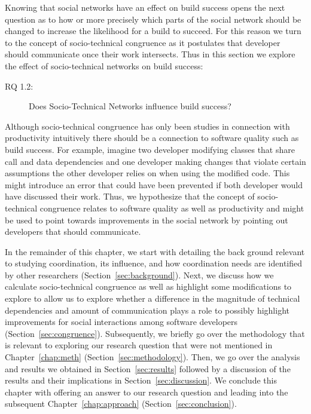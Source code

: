 \label{chap:stc-net2}
Knowing that social networks have an effect on build success opens the next question as to how or more precisely which parts of the social network should be changed to increase the likelihood for a build to succeed.
For this reason we turn to the concept of socio-technical congruence as it postulates that developer should communicate once their work intersects.
Thus in this section we explore the effect of socio-technical networks on build success:

\begin{description}
  \item[RQ 1.2:] Does Socio-Technical Networks influence build success?
\end{description}

Although socio-technical congruence has only been studies in connection with productivity intuitively there should be a connection to software quality such as build success.
For example, imagine two developer modifying classes that share call and data dependencies and one developer making changes that violate certain assumptions the other developer relies on when using the modified code.
This might introduce an error that could have been prevented if both developer would have discussed their work.
Thus, we hypothesize that the concept of socio-technical congruence relates to software quality as well as productivity and might be used to point towards improvements in the social network by pointing out developers that should communicate.

In the remainder of this chapter, we start with detailing the back ground relevant to studying coordination, its influence, and how coordination needs are identified by other researchers (Section~\ref{sec:background}).
Next, we discuss how we calculate socio-technical congruence as well as highlight some modifications to explore to allow us to explore whether a difference in the magnitude of technical dependencies and amount of communication plays a role to possibly highlight improvements for social interactions among software developers (Section~\ref{sec:congruence}).
Subsequently, we briefly go over the methodology that is relevant to exploring our research question that were not mentioned in Chapter~\ref{chap:meth} (Section~\ref{sec:methodology}).
Then, we go over the analysis and results we obtained in Section~\ref{sec:results} followed by a discussion of the results and their implications in Section~\ref{sec:discussion}.
We conclude this chapter with offering an answer to our research question and leading into the subsequent Chapter~\ref{chap:approach} (Section~\ref{sec:conclusion}).


